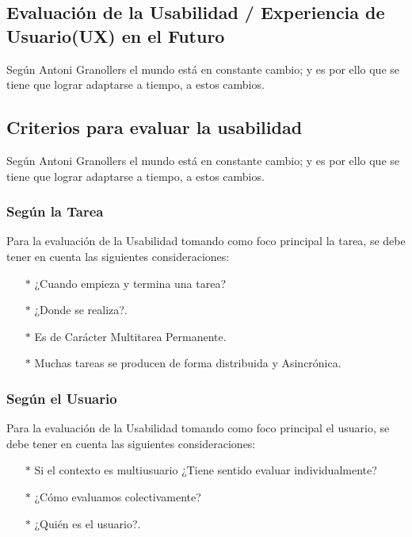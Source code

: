 \documentclass[11pt]{article}
\begin{document}
\begin{normalsize}
\begin{flushleft}
	\section{Evaluación de la Usabilidad / Experiencia de Usuario(UX) en el Futuro}
	    \begin{itemize}
	        Según Antoni Granollers el mundo está en constante cambio; y es por ello que se tiene que lograr adaptarse a tiempo, a estos cambios.
	    \end{itemize}
	    \subsection{Criterios para evaluar la usabilidad}
	    \begin{itemize}
	        Según Antoni Granollers el mundo está en constante cambio; y es por ello que se tiene que lograr adaptarse a tiempo, a estos cambios.
	    \end{itemize}
	        \subsubsection{Según la Tarea}
	        \begin{itemize}
	            Para la evaluación de la Usabilidad tomando como foco principal la tarea, se debe tener en cuenta las siguientes consideraciones:
	        \end{itemize}
	        \begin{itemize}
		    \begin{enumerate}
		        \item [$*$] ¿Cuando empieza y termina una tarea?
		        \item [$*$] ¿Donde se realiza?.
		        \item [$*$] Es de Carácter Multitarea Permanente.
		        \item [$*$] Muchas tareas se producen de forma distribuida y Asincrónica.
		    \end{enumerate}
		    \end{itemize}
	        \subsubsection{Según el Usuario}
	        \begin{itemize}
	            Para la evaluación de la Usabilidad tomando como foco principal el usuario, se debe tener en cuenta las siguientes consideraciones:
	        \end{itemize}
	        \begin{itemize}
		    \begin{enumerate}
		        \item [$*$] Si el contexto es multiusuario ¿Tiene sentido evaluar individualmente?
		        \item [$*$] ¿Cómo evaluamos colectivamente?
		        \item [$*$] ¿Quién es el usuario?.
		    \end{enumerate}
		    \end{itemize}

\end{flushleft}
\end{normalsize}
\end{document}
